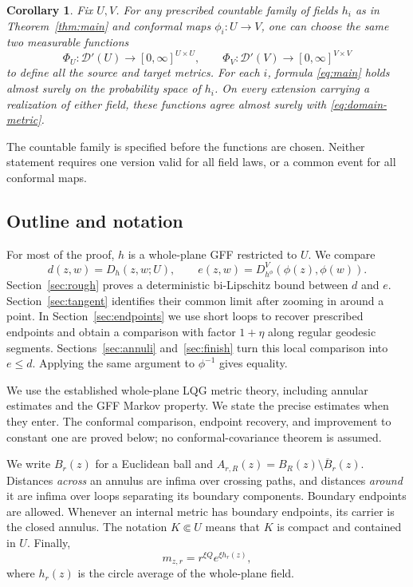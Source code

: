 \documentclass[11pt]{article}
\newtheorem{corollary}[theorem]{Corollary}
\theoremstyle{definition}
\theoremstyle{remark}
\newcommand{\Dscr}{\mathcal D'}
\begin{document}
\begin{corollary}\label{cor:countable}
Fix $U,V$. For any prescribed countable family of fields $h_i$ as in
Theorem~\ref{thm:main} and conformal maps $\phi_i:U\to V$, one can
choose the same two measurable functions
\[
 \Phi_U:\Dscr(U)\longrightarrow[0,\infty]^{U\times U},
 \qquad
 \Phi_V:\Dscr(V)\longrightarrow[0,\infty]^{V\times V}
\]
to define all the source and target metrics. For each $i$, formula
\eqref{eq:main} holds almost surely on the probability space of $h_i$.
On every extension carrying a realization of either field, these
functions agree almost surely with \eqref{eq:domain-metric}.
\end{corollary}

The countable family is specified before the functions are chosen.
Neither statement requires one version valid for all field laws,
or a common event for all conformal maps.

\subsection{Outline and notation}
For most of the proof, $h$ is a whole-plane GFF restricted to $U$.
We compare
\begin{equation}\label{eq:d-e}
 d(z,w)=D_h(z,w;U),\qquad
 e(z,w)=D_{h^\phi}^{V}(\phi(z),\phi(w)).
\end{equation}
Section~\ref{sec:rough} proves a deterministic bi-Lipschitz bound
between $d$ and $e$. Section~\ref{sec:tangent} identifies their
common limit after zooming in around a point. In
Section~\ref{sec:endpoints} we use short loops to recover prescribed
endpoints and obtain a comparison with factor $1+\eta$ along regular
geodesic segments. Sections~\ref{sec:annuli} and~\ref{sec:finish}
turn this local comparison into $e\le d$. Applying the same argument
to $\phi^{-1}$ gives equality.

We use the established whole-plane LQG metric theory, including
annular estimates and the GFF Markov property. We state the precise
estimates when they enter. The conformal comparison, endpoint
recovery, and improvement to constant one are proved below; no
conformal-covariance theorem is assumed.

We write $B_r(z)$ for a Euclidean ball and
$A_{r,R}(z)=B_R(z)\setminus\overline B_r(z)$. Distances
\emph{across} an annulus are infima over crossing paths, and
distances \emph{around} it are infima over loops separating its
boundary components. Boundary endpoints are allowed. Whenever an
internal metric has boundary endpoints, its carrier is the closed
annulus. The notation $K\Subset U$ means that $K$ is compact and
contained in $U$. Finally,
\[
                   m_{z,r}=r^{\xi Q}e^{\xi h_r(z)},
\]
where $h_r(z)$ is the circle average of the whole-plane field.
\end{document}
